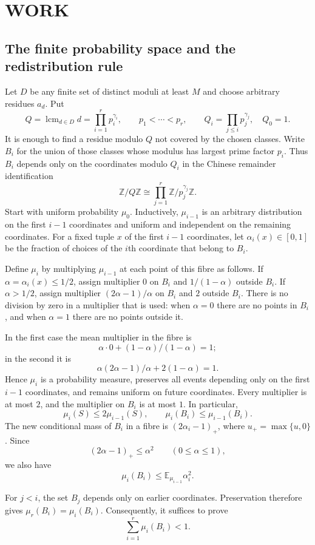 \section{WORK}
\subsection{The finite probability space and the redistribution rule}
Let $D$ be any finite set of distinct moduli at least $M$ and choose arbitrary residues $a_d$. Put
\[
 Q=\operatorname{lcm}_{d\in D}d
   =\prod_{i=1}^r p_i^{\gamma_i},\qquad p_1<\cdots<p_r,
 \qquad Q_i=\prod_{j\le i}p_j^{\gamma_j},\quad Q_0=1.
\]
It is enough to find a residue modulo $Q$ not covered by the chosen classes. Write $B_i$ for the union of those classes whose modulus has largest prime factor $p_i$. Thus $B_i$ depends only on the coordinates modulo $Q_i$ in the Chinese remainder identification
\[
 \mathbb Z/Q\mathbb Z\cong\prod_{j=1}^r\mathbb Z/p_j^{\gamma_j}\mathbb Z.
\]
Start with uniform probability $\mu_0$. Inductively, $\mu_{i-1}$ is an arbitrary distribution on the first $i-1$ coordinates and uniform and independent on the remaining coordinates. For a fixed tuple $x$ of the first $i-1$ coordinates, let $\alpha_i(x)\in[0,1]$ be the fraction of choices of the $i$th coordinate that belong to $B_i$.

Define $\mu_i$ by multiplying $\mu_{i-1}$ at each point of this fibre as follows. If $\alpha=\alpha_i(x)\le1/2$, assign multiplier $0$ on $B_i$ and $1/(1-\alpha)$ outside $B_i$. If $\alpha>1/2$, assign multiplier $(2\alpha-1)/\alpha$ on $B_i$ and $2$ outside $B_i$. There is no division by zero in a multiplier that is used: when $\alpha=0$ there are no points in $B_i$, and when $\alpha=1$ there are no points outside it.

In the first case the mean multiplier in the fibre is
\[
 \alpha\cdot0+(1-\alpha)/(1-\alpha)=1;
\]
in the second it is
\[
 \alpha(2\alpha-1)/\alpha+2(1-\alpha)=1.
\]
Hence $\mu_i$ is a probability measure, preserves all events depending only on the first $i-1$ coordinates, and remains uniform on future coordinates. Every multiplier is at most $2$, and the multiplier on $B_i$ is at most $1$. In particular,
\[
 \mu_i(S)\le2\mu_{i-1}(S),\qquad
 \mu_i(B_i)\le\mu_{i-1}(B_i).
\tag{1}
\]
The new conditional mass of $B_i$ in a fibre is $(2\alpha_i-1)_+$, where $u_+=\max\{u,0\}$. Since
\[
 (2\alpha-1)_+\le\alpha^2\qquad(0\le\alpha\le1),
\]
we also have
\[
 \mu_i(B_i)\le\mathbb E_{\mu_{i-1}}\alpha_i^2.
\tag{2}
\]

For $j<i$, the set $B_j$ depends only on earlier coordinates. Preservation therefore gives $\mu_r(B_i)=\mu_i(B_i)$. Consequently, it suffices to prove
\[
 \sum_{i=1}^r\mu_i(B_i)<1.
\tag{3}
\]

